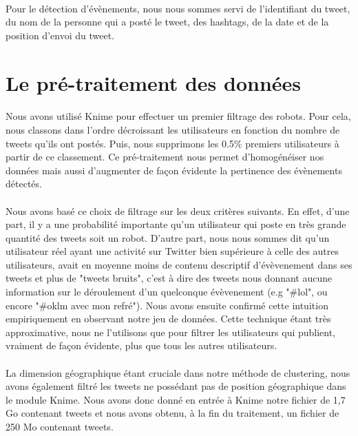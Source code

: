 \documentclass[12pt]{article}
\begin{document}
\paragraph{}
Pour le d\'etection d'\'ev\`enements, nous nous sommes servi de l'identifiant du tweet, du nom de la personne qui a post\'e le
tweet, des hashtags, de la date et de la position d'envoi du tweet.

\section{Le pr\'e-traitement des donn\'ees}

\paragraph{}
Nous avons utilis\'e Knime pour effectuer un premier filtrage des robots. Pour cela, nous classons dans l'ordre d\'ecroissant les utilisateurs en fonction du nombre de tweets qu'ils ont post\'es. Puis, nous supprimons les 0.5\% premiers utilisateurs \`{a} partir de ce classement. Ce pr\'e-traitement nous permet d'homog\'en\'eiser nos donn\'ees mais aussi d'augmenter de fa\c{c}on \'evidente la pertinence des \'ev\`enements d\'etect\'es. 
\paragraph{}
Nous avons bas\'e ce choix de filtrage sur les deux crit\`eres suivants. En effet, d'une part, il y a une probabilit\'e importante qu'un utilisateur qui poste en tr\`es grande quantit\'e des tweets soit un robot. D'autre part, nous nous sommes dit qu'un utilisateur r\'eel ayant une activit\'e sur Twitter bien sup\'erieure \`{a} celle des autres utilisateurs, avait en moyenne moins de contenu descriptif d'\'ev\`evenement dans ses tweets et plus de "tweets bruits", c'est \`{a} dire des tweets nous donnant aucune information sur le d\'eroulement d'un quelconque \'ev\`evenement (e.g "\#lol", ou encore "\#oklm avec mon refr\'e"). Nous avons ensuite confirm\'e cette intuition empiriquement en observant notre jeu de donn\'ees. 
\newline
Cette technique \'etant tr\`es approximative, nous ne l'utilisons que pour filtrer les utilisateurs qui publient, vraiment de fa\c{c}on \'evidente, plus que tous les autres utilisateurs.
\paragraph{}
La dimension g\'eographique \'etant cruciale dans notre m\'ethode de clustering, nous avons \'egalement filtr\'e les tweets ne poss\'edant pas de position g\'eographique dans le module Knime.
\newline
Nous avons donc donn\'e en entr\'ee \`{a} Knime notre fichier de 1,7 Go contenant  tweets et nous avons obtenu, \`{a} la fin du traitement, un fichier de 250 Mo contenant  tweets. 
\end{document}
